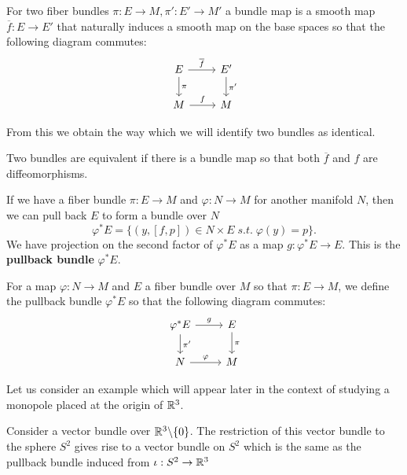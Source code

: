 		\begin{defn}
			For two fiber bundles $\pi: E \rightarrow M, \pi': E' \rightarrow M'$ a bundle map is a smooth map $\overline f: E \rightarrow E'$ that naturally induces a smooth map on the base spaces so that the following diagram commutes:
			\[
			\begin{tikzcd}
			E \arrow{r}{\overline f} \arrow{d}{\pi} & E' \arrow{d}{\pi'} \\
			M \arrow{r}{f} & M
			\end{tikzcd}
			\]
		\end{defn}
		From this we obtain the way which we will identify two bundles as identical.
		\begin{defn}
			Two bundles are equivalent if there is a bundle map so that both $\overline f$ and $f$ are diffeomorphisms. 
		\end{defn}
		If we have a fiber bundle $\pi: E \rightarrow M$ and $\varphi: N \rightarrow M$ for another manifold $N$, then we can pull back $E$ to form a bundle over $N$
		\begin{equation}
			\varphi^* E = \{(y,[f,p]) \in N \times E \; s.t. \; \varphi(y) = p \}.
		\end{equation}
		We have projection on the second factor of $\varphi^* E$ as a map $g: \varphi^* E \rightarrow E$. 
		This is the \textbf{pullback bundle} $\varphi^* E$.
		\begin{defn}
			For a map $\varphi: N \rightarrow M$ and $E$ a fiber bundle over $M$ so that $\pi: E \rightarrow M$, we define the pullback bundle $\varphi^* E$ so that the following diagram commutes:
			\[
			\begin{tikzcd}
			\varphi^* E \arrow{r}{g} \arrow{d}{\pi'} & E \arrow{d}{\pi} \\
			N \arrow{r}{\varphi} & M
			\end{tikzcd}
			\]
		\end{defn}
		Let us consider an example which will appear later in the context of studying a monopole placed at the origin of $\mathbb{R}^3$.
		\begin{eg}
			Consider a vector bundle over $\mathbb{R}^3 \backslash \{0\}$. The restriction of this vector bundle to the sphere $S^2$ gives rise to a vector bundle on $S^2$ which is the same as the pullback bundle induced from $\iota: S^2 \to \mathbb{R}^3$
		\end{eg}
		
